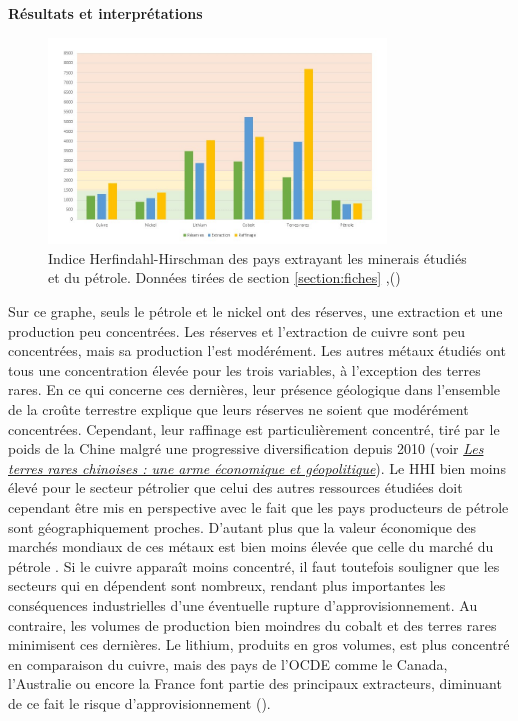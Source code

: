 \bigbreak
\textbf{Résultats et interprétations}
\smallbreak
\begin{figure}
    \centering
    \includegraphics[width=0.8\textwidth]{Images/02 appro/graphe hhi.jpg}
    \caption{Indice Herfindahl-Hirschman des pays extrayant les minerais étudiés et du pétrole. Données tirées de section \ref{section:fiches} ,(\cite{bp_statistical_2022})}
    \label{fig:HHI}
\end{figure}

Sur ce graphe, seuls le pétrole et le nickel ont des réserves, une extraction et une production peu concentrées. Les réserves et l'extraction de cuivre sont peu concentrées, mais sa production l'est modérément. Les autres métaux étudiés ont tous une concentration élevée pour les trois variables, à l'exception des terres rares. En ce qui concerne ces dernières, leur présence géologique dans l'ensemble de la croûte terrestre explique que leurs réserves ne soient que modérément concentrées. Cependant, leur raffinage est particulièrement concentré, tiré par le poids de la Chine malgré une progressive diversification depuis 2010 (voir \hyperref[Chine]{\textit{Les terres rares chinoises : une arme  économique et géopolitique}}). Le HHI bien moins élevé pour le secteur pétrolier que celui des autres ressources étudiées doit cependant être mis en perspective avec le fait que les pays producteurs de pétrole sont géographiquement proches. D'autant plus que la valeur économique des marchés mondiaux de ces métaux est bien moins élevée que celle du marché du pétrole \cite{manberger_geopolitics_2019}.
\smallbreak
Si le cuivre apparaît moins concentré, il faut toutefois souligner que les secteurs qui en dépendent sont nombreux, rendant plus importantes les conséquences industrielles d'une éventuelle rupture d'approvisionnement. Au contraire, les volumes de production bien moindres du cobalt et des terres rares minimisent ces dernières. Le lithium, produits en gros volumes, est plus concentré en comparaison du cuivre, mais des pays de l'OCDE comme le Canada, l'Australie ou encore la France font partie des principaux extracteurs, diminuant de ce fait le risque d'approvisionnement (\cite{brgm_fiche_2017}). 


